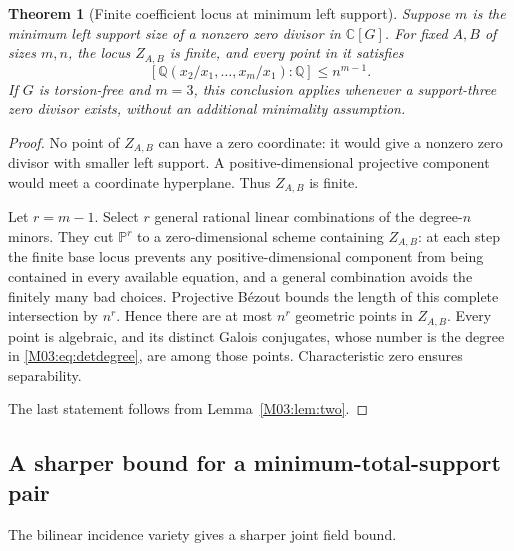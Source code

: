 \documentclass[11pt,a4paper,oneside]{report}
\newtheorem{theorem}{Theorem}[section]
\theoremstyle{definition}
\theoremstyle{remark}
\newcommand{\C}{\mathbb C}
\newcommand{\Q}{\mathbb Q}
\newcommand{\PP}{\mathbb P}
\begin{document}
\begin{theorem}[Finite coefficient locus at minimum left support]\label{M03:thm:mindegree}
Suppose \(m\) is the minimum left support size of a nonzero zero divisor in \(\C[G]\). For fixed \(A,B\) of sizes \(m,n\), the locus \(Z_{A,B}\) is finite, and every point in it satisfies
\begin{equation}\label{M03:eq:detdegree}
[\Q(x_2/x_1,\ldots,x_m/x_1):\Q]\le n^{m-1}.
\end{equation}
If \(G\) is torsion-free and \(m=3\), this conclusion applies whenever a support-three zero divisor exists, without an additional minimality assumption.
\end{theorem}
\begin{proof}
No point of \(Z_{A,B}\) can have a zero coordinate: it would give a nonzero zero divisor with smaller left support. A positive-dimensional projective component would meet a coordinate hyperplane. Thus \(Z_{A,B}\) is finite.

Let \(r=m-1\). Select \(r\) general rational linear combinations of the degree-\(n\) minors. They cut \(\PP^r\) to a zero-dimensional scheme containing \(Z_{A,B}\): at each step the finite base locus prevents any positive-dimensional component from being contained in every available equation, and a general combination avoids the finitely many bad choices. Projective B\'ezout bounds the length of this complete intersection by \(n^r\). Hence there are at most \(n^r\) geometric points in \(Z_{A,B}\). Every point is algebraic, and its distinct Galois conjugates, whose number is the degree in \eqref{M03:eq:detdegree}, are among those points. Characteristic zero ensures separability.

The last statement follows from Lemma~\ref{M03:lem:two}.
\end{proof}

\subsection{A sharper bound for a minimum-total-support pair}
The bilinear incidence variety gives a sharper joint field bound.
\end{document}
